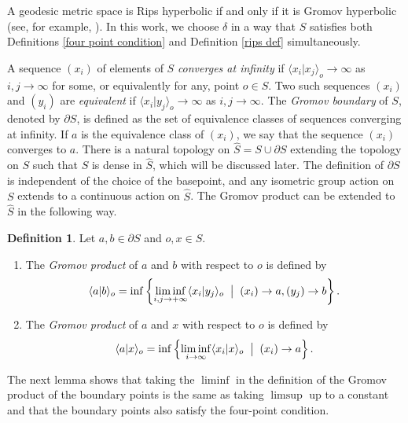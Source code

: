 \documentclass[11pt,letterpaper]{article}
\renewcommand{\l}{\langle}
\renewcommand{\r}{\rangle}
\theoremstyle{definition}
\newtheorem{defn}[thm]{Definition}
\theoremstyle{remark}
\begin{document}
A geodesic metric space is Rips hyperbolic if and only if it is Gromov hyperbolic (see, for example, \cite[Lemma 1.46]{KS}). In this work, we choose $\delta$ in a way that $S$ satisfies both Definitions \ref{four point condition} and Definition \ref{rips def} simultaneously.

A sequence $\left(x_i\right)$ of elements of $S$ \textit{converges at infinity} if $\l x_i|x_j \r_o \rightarrow \infty$ as $i, j \rightarrow \infty$ for some, or equivalently for any, point $o\in S$. Two such sequences $\left(x_i\right)$ and $\left(y_i\right)$ are \textit{equivalent} if $\l x_i|y_j \r_o \rightarrow \infty$ as $i, j \rightarrow \infty$. The {\it Gromov boundary} of $S$, denoted by $\partial S$, is defined as the set of equivalence classes of sequences converging at infinity. If $a$ is the equivalence class of $\left(x_i\right)$, we say that the sequence $(x_i)$ converges to $a$. There is a natural topology on $\widehat{S}=S \cup \partial S$ extending the topology on $S$ such that $S$ is dense in $\widehat{S}$, which will be discussed later.  The definition of $\partial S$ is independent of the choice of the basepoint, and any isometric group action on $S$ extends to a continuous action on $\widehat S$. The Gromov product can be extended to $\widehat{S}$ in the following way.
\begin{defn}\label{Gromov product of boundary points}
Let $a, b \in \partial S$ and $o, x \in S$. 
\begin{enumerate}
\item The {\it Gromov product} of  $a$ and $b$ with respect to $o$ is defined by
\begin{equation*}
\l a| b\r_o = \inf \left\{ \liminf_{i, j \rightarrow +\infty} \l x_i|y_j\r_o \; \bigm | \; (x_i) \rightarrow a, (y_j) \rightarrow b \right \}.
\end{equation*}
\item The {\it Gromov product} of $a$ and $x$ with respect to $o$ is defined by
\begin{equation*}
\l a|x\r_o = \inf \left \{ \liminf_{i \rightarrow \infty} \l x_i|x\r_o \; \bigm | \; (x_i) \rightarrow a \right \}.
\end{equation*}
\end{enumerate}
\end{defn}
The next lemma shows that taking the $\liminf$ in the definition of the Gromov product of the boundary points is the same as taking $\limsup$ up to a constant and that the boundary points also satisfy the four-point condition.
\end{document}
